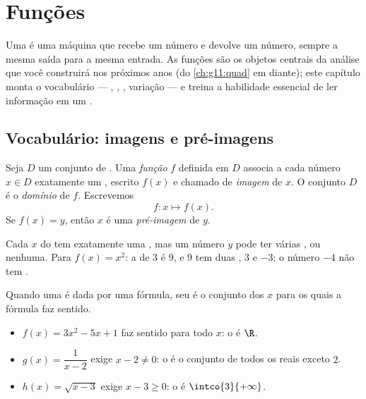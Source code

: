 \chapter{Funções}\label{ch:g10:functions}

Uma  é uma máquina que recebe um número e devolve um número, sempre
a mesma saída para a mesma entrada. As funções são os objetos centrais da
análise que você construirá nos próximos anos (do \cref{ch:g11:quad} em
diante); este capítulo monta o vocabulário --- , , ,
variação --- e treina a habilidade essencial de ler informação em um
.

\section{Vocabulário: imagens e pré-imagens}

\begin{definition}[Função]\label{def:g10:functions:function}
Seja $D$ um conjunto de . Uma \emph{função} $f$
definida em $D$ associa a cada número $x \in D$ exatamente um , escrito $f(x)$ e chamado de \emph{imagem} de $x$. O
conjunto $D$ é o \emph{domínio} de $f$. Escrevemos
\[
f : x \longmapsto f(x).
\]
Se $f(x) = y$, então $x$ é uma \emph{pré-imagem} de $y$.
\end{definition}

\begin{remark}
Cada $x$ do  tem exatamente uma , mas um número $y$ pode ter
várias , ou nenhuma. Para $f(x) = x^2$: a  de $3$ é $9$,
e $9$ tem duas , $3$ e $-3$; o número $-4$ não tem
.
\end{remark}

\begin{example}\label{ex:g10:functions:domain}
Quando uma  é dada por uma fórmula, seu  é o conjunto dos
$x$ para os quais a fórmula faz sentido.
\begin{itemize}
  \item $f(x) = 3x^2 - 5x + 1$ faz sentido para todo $x$: o  é
        $\R$.
  \item $g(x) = \dfrac{1}{x - 2}$ exige $x - 2 \neq 0$: o  é o
        conjunto de todos os reais exceto $2$.
  \item $h(x) = \sqrt{x - 3}$ exige $x - 3 \geq 0$: o  é
        $\intco{3}{+\infty}$.
\end{itemize}
\end{example}

